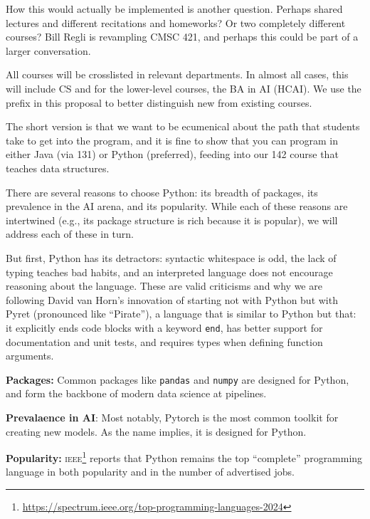 How this would actually be implemented is another question.  Perhaps shared lectures and different recitations and homeworks?  Or two completely different courses?  Bill Regli is revampling CMSC 421, and perhaps this could be part of a larger conversation.


All courses will be crosslisted in relevant departments.  In almost all cases, this will include CS and for the lower-level courses, the BA in AI (HCAI).  We use the \prefix{} prefix in this proposal to better distinguish new from existing courses.



The short version is that we want to be ecumenical about the path that students take to get into the program, and it is fine to show that you can program in either Java (via 131) or Python (preferred), feeding into our 142 course that teaches data structures.

There are several reasons to choose Python: its breadth of packages, its prevalence in the AI arena, and its popularity.  While each of these reasons are intertwined (e.g., its package structure is rich because it is popular), we will address each of these in turn.

But first, Python has its detractors: syntactic whitespace is odd, the lack of typing teaches bad habits, and an interpreted language does not encourage reasoning about the language.  These are valid criticisms and why we are following David van Horn's innovation of starting not with Python but with Pyret (pronounced like ``Pirate''), a language that is similar to Python but that: it explicitly ends code blocks with a keyword \texttt{end}, has better support for documentation and unit tests, and requires types when defining function arguments.

\textbf{Packages:} Common packages like \texttt{pandas} and \texttt{numpy} are designed for Python, and form the backbone of modern data science at \ai{} pipelines.

\textbf{Prevalaence in AI}: Most notably, Pytorch is the most common toolkit for creating new \ai{} models.  As the name implies, it is designed for Python.  

\textbf{Popularity:} \textsc{ieee}\footnote{\url{https://spectrum.ieee.org/top-programming-languages-2024}} reports that Python remains the top ``complete'' programming language in both popularity and in the number of advertised jobs.

